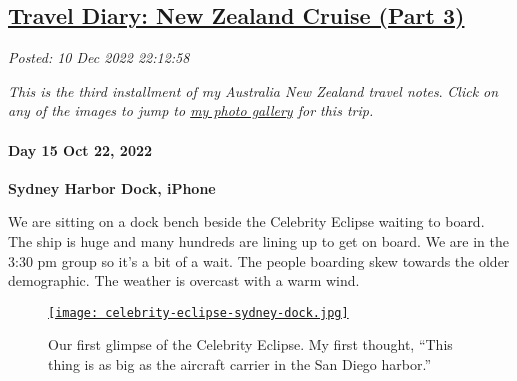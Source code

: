 %

\subsection*{\href{http://analyzethedatanotthedrivel.org/2022/12/10/travel-diary-new-zealand-cruise-part-3/}{Travel Diary: New Zealand Cruise (Part 3)}}


\noindent\emph{Posted: 10 Dec 2022 22:12:58}
\vspace{6pt}

\emph{This is the third installment of my Australia New Zealand travel
notes}. \emph{Click on any of the images to jump to
\href{https://conceptcontrol.smugmug.com/Trips/Overseas/Australia-New-Zealand-2022/}{my
photo gallery} for this trip.}

%
%

\hypertarget{day-15-oct-22-2022}{%
\paragraph{\texorpdfstring{\textbf{Day 15 Oct 22, 2022}}{Day 15 Oct 22, 2022}}\label{day-15-oct-22-2022}}

\textbf{Sydney Harbor Dock, iPhone}

We are sitting on a dock bench beside the Celebrity Eclipse waiting to
board. The ship is huge and many hundreds are lining up to get on board.
We are in the 3:30 pm group so it's a bit of a wait. The people boarding
skew towards the older demographic. The weather is overcast with a warm
wind.

\captionsetup[figure]{labelformat=empty}
\begin{SCfigure}
\centering
\href{https://conceptcontrol.smugmug.com/Trips/Overseas/Australia-New-Zealand-2022/i-VvRjC49/A}{\texttt{[image: celebrity-eclipse-sydney-dock.jpg]}}
\caption[Our first glimpse of the Celebrity Eclipse]{Our first glimpse of the Celebrity Eclipse. My first thought,
``This thing is as big as the aircraft carrier in the San Diego
harbor.''}
\label{fig:7606x0}
\end{SCfigure}

